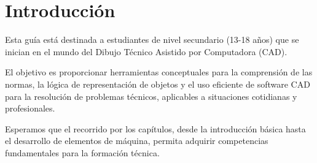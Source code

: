 \chapter*{Introducción}
Esta guía está destinada a estudiantes de nivel secundario (13-18 años) que se inician en el mundo del Dibujo Técnico Asistido por Computadora (CAD).

El objetivo es proporcionar herramientas conceptuales para la comprensión de las normas, la lógica de representación de objetos y el uso eficiente de software CAD para la resolución de problemas técnicos, aplicables a situaciones cotidianas y profesionales.

Esperamos que el recorrido por los capítulos, desde la introducción básica hasta el desarrollo de elementos de máquina, permita adquirir competencias fundamentales para la formación técnica.
\newpage
